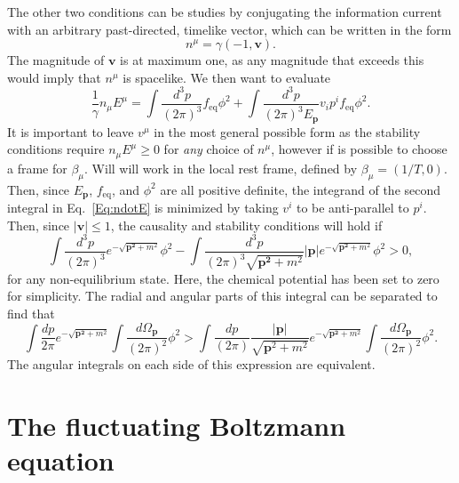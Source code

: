 \documentclass[aps,prd,preprint,nofootinbib,amsmath,amssymb,showpacs,longbibliography,singlecolumn,superscriptaddress,10pt]{revtex4-1}
\theoremstyle{plain}
\theoremstyle{definition}
\begin{document}
The other two conditions can be studies by conjugating the information current with an arbitrary past-directed, timelike vector, which can be written in the form 
\begin{equation}
    n^{\mu} = \gamma (-1, \mathbf{v}) .
\end{equation}
The magnitude of $\mathbf{v}$ is at maximum one, as any magnitude that exceeds this would imply that $n^{\mu}$ is spacelike. We then want to evaluate 
\begin{equation} \label{Eq:ndotE}
    \frac{1}{\gamma} n_{\mu} E^{\mu} = \int \frac{d^3p}{(2\pi)^3} f_{\mathrm{eq}} \phi^2 + \int \frac{d^3p}{(2\pi)^3 E_{\mathbf{p}}} v_i p^i f_{\mathrm{eq}} \phi^2 .
\end{equation}
It is important to leave $v^{\mu}$ in the most general possible form as the stability conditions require $n_{\mu} E^{\mu} \geq 0$ for \emph{any} choice of $n^{\mu}$, however if is possible to choose a frame for $\beta_{\mu}$. Will will work in the local rest frame, defined by $\beta_{\mu} = (1/T , 0)$. Then, since $E_{\mathbf{p}}$, $f_{\mathrm{eq}}$, and $\phi^2$ are all positive definite, the integrand of the second integral in Eq.\ \eqref{Eq:ndotE} is minimized by taking $v^i$ to be anti-parallel to $p^i$. Then, since $|\mathbf{v}| \leq 1$, the causality and stability conditions will hold if 
\begin{equation}
    \int \frac{d^3p}{(2\pi)^3} e^{-\sqrt{\mathbf{p^2}+m^2}} \phi^2 - \int \frac{d^3p}{(2\pi)^3 \sqrt{\mathbf{p^2} + m^2}} |\mathbf{p}| e^{-\sqrt{\mathbf{p^2}+m^2}} \phi^2 > 0 ,
\end{equation}
for any non-equilibrium state. Here, the chemical potential has been set to zero for simplicity. The radial and angular parts of this integral can be separated to find that 
\begin{equation}
    \int \frac{dp}{2\pi} e^{-\sqrt{\mathbf{p^2}+m^2}} \int \frac{d\Omega_{\mathbf{p}}}{(2\pi)^2} \phi^2 > \int \frac{dp}{(2\pi)} \frac{|\mathbf{p}|}{\sqrt{\mathbf{p}^2 + m^2}} e^{-\sqrt{\mathbf{p^2}+m^2}} \int \frac{d\Omega_{\mathbf{p}}}{(2\pi)^2} \phi^2 .
\end{equation}
The angular integrals on each side of this expression are equivalent.

\section{The fluctuating Boltzmann equation}
\end{document}
